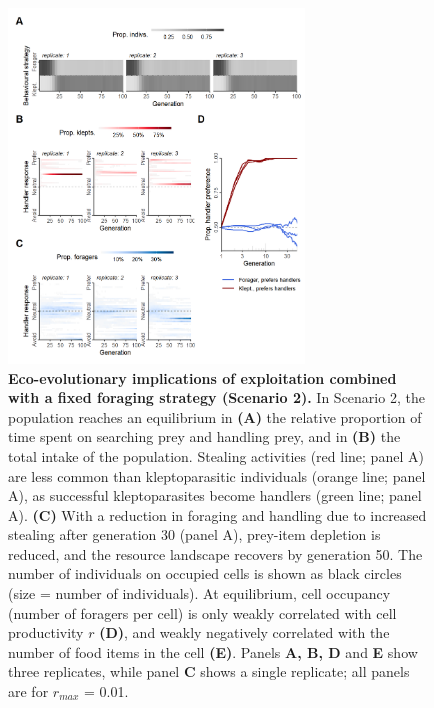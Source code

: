 \documentclass[11pt]{article}
\begin{document}
\begin{figure}[h!]
    \centering
    \includegraphics[width=0.70\textwidth]{figures/fig_03.png}
    \caption{
        \textbf{Eco-evolutionary implications of exploitation combined with a fixed foraging strategy (Scenario 2).}
        In Scenario 2, the population reaches an equilibrium in \textbf{(A)} the relative proportion of time spent on searching prey and handling prey, and in \textbf{(B)} the total intake of the population.
        Stealing activities (red line; panel A) are less common than kleptoparasitic individuals (orange line; panel A), as successful kleptoparasites become handlers (green line; panel A).
        \textbf{(C)} With a reduction in foraging and handling due to increased stealing after generation 30 (panel A), prey-item depletion is reduced, and the resource landscape recovers by generation 50.
        The number of individuals on occupied cells is shown as black circles (size = number of individuals). 
        At equilibrium, cell occupancy (number of foragers per cell) is only weakly correlated with cell productivity $r$ \textbf{(D)}, and weakly negatively correlated with the number of food items in the cell \textbf{(E)}.
        Panels \textbf{A, B, D} and \textbf{E} show three replicates, while panel \textbf{C} shows a single replicate; all panels are for $r_{max}$ = 0.01.
    }
    \label{Fig:Model2}
\end{figure}
\end{document}

